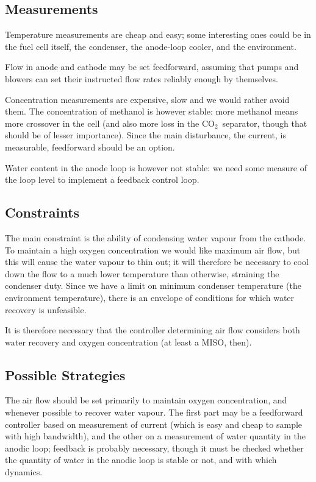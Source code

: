 \documentclass[a4paper,10pt]{article}
\newcommand{\COO}{\ensuremath{\mathrm{CO_2}}}
\begin{document}
\subsection{Measurements}
Temperature measurements are cheap and easy; some interesting ones could be in
the fuel cell itself, the condenser, the anode-loop cooler, and the environment.

Flow in anode and cathode may be set feedforward, assuming that pumps and
blowers can set their instructed flow rates reliably enough by themselves.

Concentration measurements are expensive, slow and we would rather avoid them.
The concentration of methanol is however stable: more methanol means more
crossover in the cell (and also more loss in the \COO\ separator, though that
should be of lesser importance). Since the main disturbance, the current, is
measurable, feedforward should be an option.

Water content in the anode loop is however not stable: we need some measure of
the loop level to implement a feedback control loop.

\subsection{Constraints}
The main constraint is the ability of condensing water vapour from the cathode.
To maintain a high oxygen concentration we would like maximum air flow, but this
will cause the water vapour to thin out; it will therefore be necessary to cool
down the flow to a much lower temperature than otherwise, straining the
condenser duty. Since we have a limit on minimum condenser temperature (the
environment temperature), there is an envelope of conditions for which water
recovery is unfeasible.

It is therefore necessary that the controller determining air flow considers
both water recovery and oxygen concentration (at least a MISO, then).

\subsection{Possible Strategies}
The air flow should be set primarily to maintain oxygen concentration, and
whenever possible to recover water vapour. The first part may be a feedforward
controller based on measurement of current (which is easy and cheap to sample
with high bandwidth), and the other on a measurement of water quantity in the
anodic loop; feedback is probably necessary, though it must be checked whether
the quantity of water in the anodic loop is stable or not, and with which
dynamics.
\end{document}
